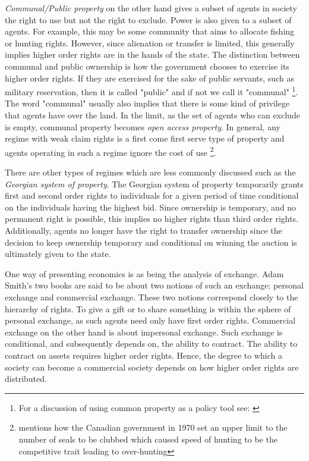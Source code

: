 \textit{Communal/Public property} on the other hand gives a subset of agents in society the right to use but not the right to exclude. Power is also given to a subset of agents. For example, this may be some community that aims to allocate fishing or hunting rights.
However, since alienation or transfer is limited, this generally implies higher order rights are in the hands of the state. The distinction between communal and public ownership is how the government chooses to exercise its higher order rights. If they are exercised for the sake of public servants, such as military reservation, then it is called "public" and if not we call it "communal" \footnote{For a discussion of using common property as a policy tool see: \cite{ciriacy1975common}}. The word "communal" usually also implies that there is some kind of privilege that agents have over the land. In the limit, as the set of agents who can exclude is empty, communal property becomes \textit{open access property}. In general, any regime with weak claim rights is a first come first serve type of property and agents operating in such a regime ignore the cost of use \footnote{\cite{Alchian1973} mentions how the Canadian government in 1970 set an upper limit to the number of seals to be clubbed which caused speed of hunting to be the competitive trait leading to over-hunting}.

There are other types of regimes which are less commonly discussed such as the \textit{Georgian system of property}. The Georgian system of property temporarily grants first and second order rights to individuals for a given period of time conditional on the individuals having the highest bid. Since ownership is temporary, and no permanent right is possible, this implies no higher rights than third order rights. Additionally, agents no longer have the right to transfer ownership since the decision to keep ownership temporary and conditional on winning the auction is ultimately given to the state.

One way of presenting economics is as being the analysis of exchange. Adam Smith's two books are said to be about two notions of such an exchange; personal exchange and commercial exchange. These two notions correspond closely to the hierarchy of rights. To give a gift or to share something is within the sphere of personal exchange, as such agents need only have first order rights. Commercial exchange on the other hand is about impersonal exchange. Such exchange is conditional, and subsequently depends on, the ability to contract. The ability to contract on assets requires higher order rights. Hence, the degree to which a society can become a commercial society depends on how higher order rights are distributed. 

